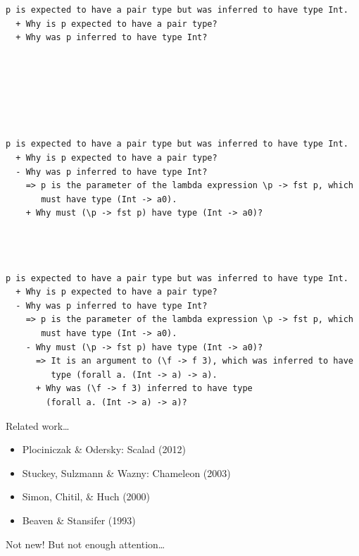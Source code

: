 \documentclass[xcolor=svgnames,12pt,aspectratio=169]{beamer}
\newenvironment{xframe}[1][]
  {\begin{frame}[fragile,environment=xframe,#1]}
  {\end{frame}}
\begin{document}
\begin{xframe}{}
  \small
\begin{Verbatim}
p is expected to have a pair type but was inferred to have type Int.
  + Why is p expected to have a pair type?
  + Why was p inferred to have type Int?







\end{Verbatim}
\end{xframe}

\begin{xframe}{}
  \small
\begin{Verbatim}
p is expected to have a pair type but was inferred to have type Int.
  + Why is p expected to have a pair type?
  - Why was p inferred to have type Int?
    => p is the parameter of the lambda expression \p -> fst p, which
       must have type (Int -> a0).
    + Why must (\p -> fst p) have type (Int -> a0)?




\end{Verbatim}
\end{xframe}

\begin{xframe}{}
  \small
\begin{Verbatim}
p is expected to have a pair type but was inferred to have type Int.
  + Why is p expected to have a pair type?
  - Why was p inferred to have type Int?
    => p is the parameter of the lambda expression \p -> fst p, which
       must have type (Int -> a0).
    - Why must (\p -> fst p) have type (Int -> a0)?
      => It is an argument to (\f -> f 3), which was inferred to have
         type (forall a. (Int -> a) -> a).
      + Why was (\f -> f 3) inferred to have type
        (forall a. (Int -> a) -> a)?
\end{Verbatim}
\end{xframe}

\begin{xframe}{Related work\dots}
  \begin{itemize}
  \item Plociniczak \& Odersky: Scalad (2012)
  \item Stuckey, Sulzmann \& Wazny: Chameleon (2003)
  \item Simon, Chitil, \& Huch (2000)
  \item Beaven \& Stansifer (1993)
  \end{itemize}

  Not new! But not enough attention\dots

\end{xframe}
\end{document}
